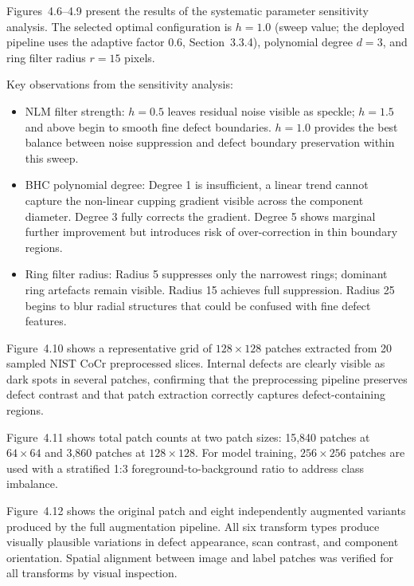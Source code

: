 Figures~4.6--4.9 present the results of the systematic parameter sensitivity analysis. The selected
optimal configuration is $h = 1.0$ (sweep value; the deployed pipeline uses the adaptive factor 0.6,
Section~3.3.4), polynomial degree $d = 3$, and ring filter radius $r = 15$ pixels.

Key observations from the sensitivity analysis:
\begin{itemize}
\item NLM filter strength: $h = 0.5$ leaves residual noise visible as speckle; $h = 1.5$ and above
  begin to smooth fine defect boundaries. $h = 1.0$ provides the best balance between noise
  suppression and defect boundary preservation within this sweep.
\item BHC polynomial degree: Degree 1 is insufficient, a linear trend cannot capture the non-linear
  cupping gradient visible across the component diameter. Degree 3 fully corrects the gradient.
  Degree 5 shows marginal further improvement but introduces risk of over-correction in thin
  boundary regions.
\item Ring filter radius: Radius 5 suppresses only the narrowest rings; dominant ring artefacts
  remain visible. Radius 15 achieves full suppression. Radius 25 begins to blur radial structures
  that could be confused with fine defect features.
\end{itemize}

Figure~4.10 shows a representative grid of $128\times128$ patches extracted from 20 sampled NIST CoCr
preprocessed slices. Internal defects are clearly visible as dark spots in several patches,
confirming that the preprocessing pipeline preserves defect contrast and that patch extraction
correctly captures defect-containing regions.

Figure~4.11 shows total patch counts at two patch sizes: 15,840 patches at $64\times64$ and 3,860
patches at $128\times128$. For model training, $256\times256$ patches are used with a stratified 1:3
foreground-to-background ratio to address class imbalance.

Figure~4.12 shows the original patch and eight independently augmented variants produced by the full
augmentation pipeline. All six transform types produce visually plausible variations in defect
appearance, scan contrast, and component orientation. Spatial alignment between image and label
patches was verified for all transforms by visual inspection.


